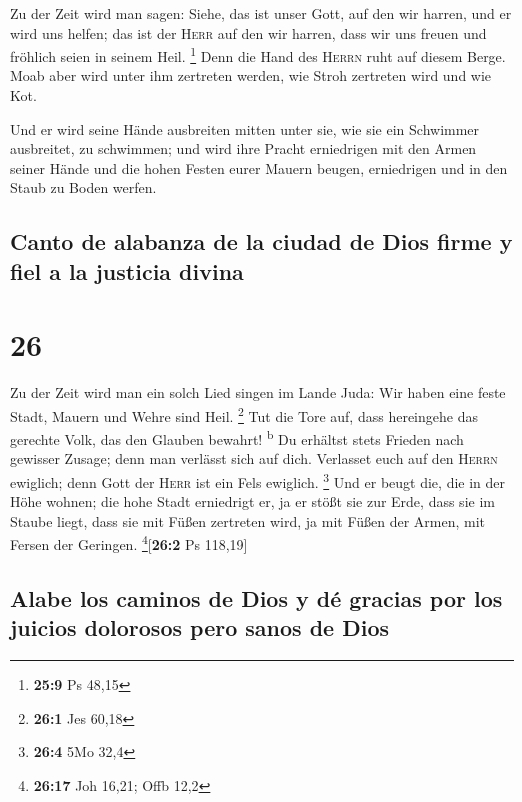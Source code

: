  Zu der Zeit wird man sagen: Siehe, das ist unser Gott,
auf den wir harren, und er wird uns helfen; das ist der \textsc{Herr}
auf den wir harren, dass wir uns freuen und fröhlich seien in seinem
Heil. \footnote{\textbf{25:9} Ps 48,15}  Denn die Hand
des \textsc{Herrn} ruht auf diesem Berge. Moab aber wird unter ihm
zertreten werden, wie Stroh zertreten wird und wie Kot.

 Und er wird seine Hände ausbreiten mitten unter sie, wie
sie ein Schwimmer ausbreitet, zu schwimmen; und wird ihre Pracht
erniedrigen mit den Armen seiner Hände  und die hohen
Festen eurer Mauern beugen, erniedrigen und in den Staub zu Boden
werfen.

\hypertarget{canto-de-alabanza-de-la-ciudad-de-dios-firme-y-fiel-a-la-justicia-divina}{%
\subsection{Canto de alabanza de la ciudad de Dios firme y fiel a la
justicia
divina}\label{canto-de-alabanza-de-la-ciudad-de-dios-firme-y-fiel-a-la-justicia-divina}}

\hypertarget{section-25}{%
\section{26}\label{section-25}}

 Zu der Zeit wird man ein solch Lied singen im Lande Juda:
Wir haben eine feste Stadt, Mauern und Wehre sind Heil. \footnote{\textbf{26:1}
  Jes 60,18}  Tut die Tore auf, dass hereingehe das
gerechte Volk, das den Glauben bewahrt! \textsuperscript{b}
 Du erhältst stets Frieden nach gewisser Zusage; denn man
verlässt sich auf dich.  Verlasset euch auf den
\textsc{Herrn} ewiglich; denn Gott der \textsc{Herr} ist ein Fels
ewiglich. \footnote{\textbf{26:4} 5Mo 32,4}  Und er beugt
die, die in der Höhe wohnen; die hohe Stadt erniedrigt er, ja er stößt
sie zur Erde, dass sie im Staube liegt,  dass sie mit
Füßen zertreten wird, ja mit Füßen der Armen, mit Fersen der Geringen.
\footnote{\textbf{26:17} Joh 16,21; Offb 12,2}{[}\textbf{26:2} Ps
118,19{]}

\hypertarget{alabe-los-caminos-de-dios-y-duxe9-gracias-por-los-juicios-dolorosos-pero-sanos-de-dios}{%
\subsection{Alabe los caminos de Dios y dé gracias por los juicios
dolorosos pero sanos de
Dios}\label{alabe-los-caminos-de-dios-y-duxe9-gracias-por-los-juicios-dolorosos-pero-sanos-de-dios}}

